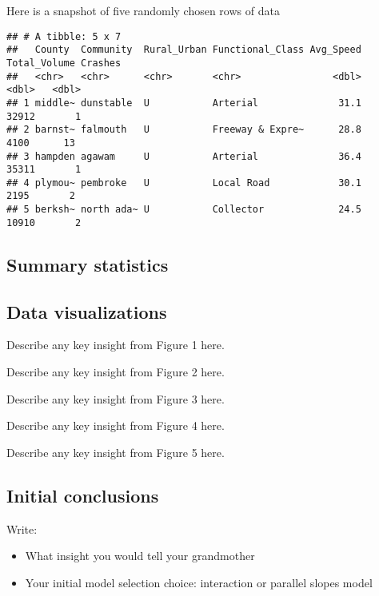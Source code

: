 \documentclass[
]{article}
\providecommand{\tightlist}{%
  \setlength{\itemsep}{0pt}\setlength{\parskip}{0pt}}
\begin{document}
Here is a snapshot of five randomly chosen rows of data

\begin{verbatim}
## # A tibble: 5 x 7
##   County  Community  Rural_Urban Functional_Class Avg_Speed Total_Volume Crashes
##   <chr>   <chr>      <chr>       <chr>                <dbl>        <dbl>   <dbl>
## 1 middle~ dunstable  U           Arterial              31.1        32912       1
## 2 barnst~ falmouth   U           Freeway & Expre~      28.8         4100      13
## 3 hampden agawam     U           Arterial              36.4        35311       1
## 4 plymou~ pembroke   U           Local Road            30.1         2195       2
## 5 berksh~ north ada~ U           Collector             24.5        10910       2
\end{verbatim}

\hypertarget{summary-statistics}{%
\subsection{Summary statistics}\label{summary-statistics}}

\hypertarget{data-visualizations}{%
\subsection{Data visualizations}\label{data-visualizations}}

Describe any key insight from Figure 1 here.

Describe any key insight from Figure 2 here.

Describe any key insight from Figure 3 here.

Describe any key insight from Figure 4 here.

Describe any key insight from Figure 5 here.

\hypertarget{initial-conclusions}{%
\subsection{Initial conclusions}\label{initial-conclusions}}

Write:

\begin{itemize}
\tightlist
\item
  What insight you would tell your grandmother
\item
  Your initial model selection choice: interaction or parallel slopes
  model
\end{itemize}
\end{document}
